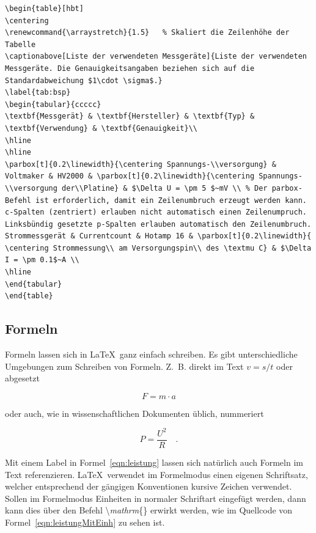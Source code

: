 \begin{lstlisting}[caption=Quellcode der Tabelle~\ref{tab:bsp}.,label=lst:tab]
\begin{table}[hbt]	
\centering
\renewcommand{\arraystretch}{1.5}	% Skaliert die Zeilenhöhe der Tabelle
\captionabove[Liste der verwendeten Messgeräte]{Liste der verwendeten Messgeräte. Die Genauigkeitsangaben beziehen sich auf die Standardabweichung $1\cdot \sigma$.}
\label{tab:bsp}
\begin{tabular}{ccccc}
\textbf{Messgerät} & \textbf{Hersteller} & \textbf{Typ} & \textbf{Verwendung} & \textbf{Genauigkeit}\\ 
\hline 
\hline 
\parbox[t]{0.2\linewidth}{\centering Spannungs-\\versorgung} & Voltmaker & HV2000 & \parbox[t]{0.2\linewidth}{\centering Spannungs-\\versorgung der\\Platine} & $\Delta U = \pm 5 $~mV \\ % Der parbox-Befehl ist erforderlich, damit ein Zeilenumbruch erzeugt werden kann. c-Spalten (zentriert) erlauben nicht automatisch einen Zeilenumpruch. Linksbündig gesetzte p-Spalten erlauben automatisch den Zeilenumbruch.
Strommessgerät & Currentcount & Hotamp 16 & \parbox[t]{0.2\linewidth}{ \centering Strommessung\\ am Versorgungspin\\ des \textmu C} & $\Delta I = \pm 0.1$~A \\ 
\hline 
\end{tabular} 
\end{table}
\end{lstlisting}

\clearpage

\subsection{Formeln}

Formeln lassen sich in \LaTeX~ganz einfach schreiben. Es gibt unterschiedliche Umgebungen zum Schreiben von Formeln. Z.~B. direkt im Text $v=s/t$ oder abgesetzt

\[F=m \cdot a\]

oder auch, wie in wissenschaftlichen Dokumenten üblich, nummeriert

\begin{equation}
P=\frac{U^2}{R} \quad .
\label{eqn:leistung}
\end{equation}

Mit einem Label in Formel~\ref{eqn:leistung} lassen sich natürlich auch Formeln im Text referenzieren. \LaTeX~verwendet im Formelmodus einen eigenen Schriftsatz, welcher entsprechend der gängigen Konventionen kursive Zeichen verwendet. Sollen im Formelmodus Einheiten in normaler Schriftart eingefügt werden, dann kann dies über den Befehl \textbackslash \textit{mathrm}\{\} erwirkt werden, wie im Quellcode von Formel~\ref{eqn:leistungMitEinh} zu sehen ist.

